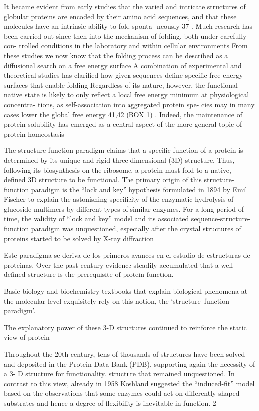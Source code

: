 It became evident from early studies that
the varied and intricate structures of globular proteins
are encoded by their amino acid sequences, and that
these molecules have an intrinsic ability to fold sponta-
neously 37 . Much research has been carried out since then
into the mechanism of folding, both under carefully con-
trolled conditions in the laboratory and within cellular
environments
From these studies we now know that the folding
process can be described as a diffusional search on a free
energy surface
A combination of experimental and
theoretical studies has clarified how given sequences
define specific free energy surfaces that enable folding
Regardless of its nature,
however, the functional native state is likely to only reflect
a local free energy minimum at physiological concentra-
tions, as self-association into aggregated protein spe-
cies may in many cases lower the global free energy 41,42
(BOX 1) . Indeed, the maintenance of protein solubility has
emerged as a central aspect of the more general topic of
protein homeostasis


The structure-function paradigm claims that a specific function of a protein is determined by its unique and rigid three-dimensional (3D) structure. 
Thus, following its biosynthesis on the ribosome, a protein must fold to a native, defined 3D structure to be functional. 
The primary origin of this structure-function paradigm is the “lock and key” hypothesis formulated in 1894 by Emil Fischer to explain the astonishing specificity of the enzymatic hydrolysis of glucoside multimers by different types
of similar enzymes. For a long period of time, the validity of “lock and key” model and its associated sequence-structure-function paradigm was unquestioned, especially after the crystal structures of proteins started to be solved by X-ray diffraction

Este paradigma se deriva de los primeros avances en el estudio de estructuras de proteinas. Over the past century evidence steadily accumulated that a well-defined structure is the prerequisite of protein function.

Basic biology and biochemistry textbooks that explain biological phenomena at the molecular level exquisitely rely on this notion, the ‘structure–function paradigm’.

The explanatory power of these 3-D structures continued to reinforce the static view of protein


Throughout the 20th century, tens of
thousands of structures have been solved and deposited in the
Protein Data Bank (PDB), supporting again the necessity of a 3-
D structure for functionality.
structure that remained unquestioned.
In contrast to this view,
already in 1958 Koshland suggested the “induced-fit” model
based on the observations that some enzymes could act on
differently shaped substrates and hence a degree of flexibility is
inevitable in function. 2

